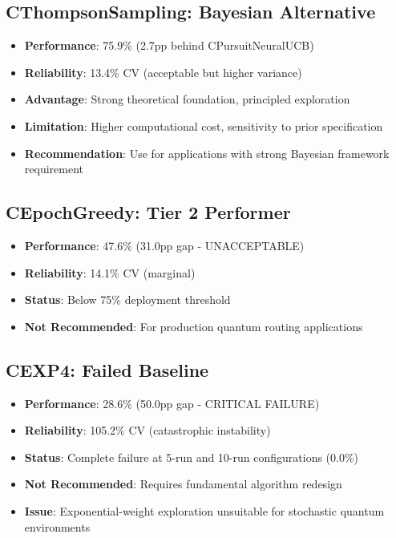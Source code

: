\documentclass[12pt,a4paper]{article}
\newcommand{\warning}[1]{\textcolor{warningred}{\textbf{#1}}}
\begin{document}
\subsection{CThompsonSampling: Bayesian Alternative}

\begin{itemize}
\item \textbf{Performance}: 75.9\% (2.7pp behind CPursuitNeuralUCB)
\item \textbf{Reliability}: 13.4\% CV (acceptable but higher variance)
\item \textbf{Advantage}: Strong theoretical foundation, principled exploration
\item \warning{Limitation}: Higher computational cost, sensitivity to prior specification
\item \textbf{Recommendation}: Use for applications with strong Bayesian framework requirement
\end{itemize}

\subsection{CEpochGreedy: Tier 2 Performer}

\begin{itemize}
\item \textbf{Performance}: 47.6\% (31.0pp gap - UNACCEPTABLE)
\item \textbf{Reliability}: 14.1\% CV (marginal)
\item \warning{Status}: Below 75\% deployment threshold
\item \textbf{Not Recommended}: For production quantum routing applications
\end{itemize}

\subsection{CEXP4: Failed Baseline}

\begin{itemize}
\item \textbf{Performance}: 28.6\% (50.0pp gap - CRITICAL FAILURE)
\item \warning{Reliability}: 105.2\% CV (catastrophic instability)
\item \warning{Status}: Complete failure at 5-run and 10-run configurations (0.0\%)
\item \warning{Not Recommended}: Requires fundamental algorithm redesign
\item \textbf{Issue}: Exponential-weight exploration unsuitable for stochastic quantum environments
\end{itemize}
\end{document}
